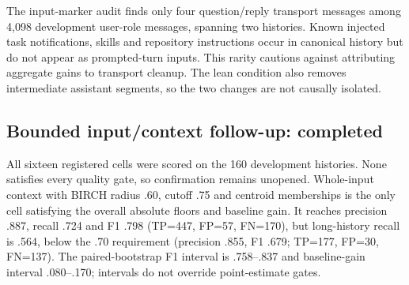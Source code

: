 \documentclass[11pt]{article}
\begin{document}
The input-marker audit finds only four question/reply transport messages among
4,098 development user-role messages, spanning two histories. Known injected
task notifications, skills and repository instructions occur in canonical
history but do not appear as prompted-turn inputs. This rarity cautions against
attributing aggregate gains to transport cleanup. The lean condition also
removes intermediate assistant segments, so the two changes are not causally isolated.

\subsection{Bounded input/context follow-up: completed}
All sixteen registered cells were scored on the 160 development histories.
None satisfies every quality gate, so confirmation remains unopened. Whole-input
context with BIRCH radius .60, cutoff .75 and centroid memberships is the only
cell satisfying the overall absolute floors and baseline gain. It reaches
precision .887, recall .724 and F1 .798 (TP=447, FP=57, FN=170), but long-history
recall is .564, below the .70 requirement (precision .855, F1 .679;
TP=177, FP=30, FN=137). The paired-bootstrap F1 interval is .758--.837 and
baseline-gain interval .080--.170; intervals do not override point-estimate gates.
\end{document}
